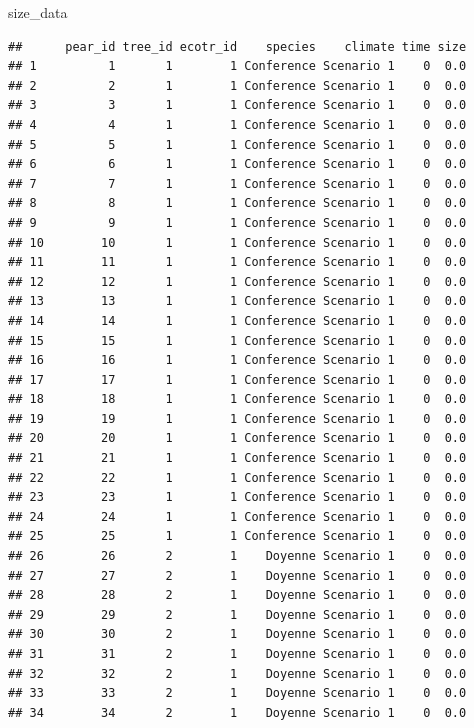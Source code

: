 \documentclass[
]{article}
\newenvironment{Shaded}{\begin{snugshade}}{\end{snugshade}}
\newcommand{\NormalTok}[1]{#1}
\begin{document}
\begin{Shaded}
\begin{Highlighting}[]
\NormalTok{size\_data}
\end{Highlighting}
\end{Shaded}

\begin{verbatim}
##      pear_id tree_id ecotr_id    species    climate time size
## 1          1       1        1 Conference Scenario 1    0  0.0
## 2          2       1        1 Conference Scenario 1    0  0.0
## 3          3       1        1 Conference Scenario 1    0  0.0
## 4          4       1        1 Conference Scenario 1    0  0.0
## 5          5       1        1 Conference Scenario 1    0  0.0
## 6          6       1        1 Conference Scenario 1    0  0.0
## 7          7       1        1 Conference Scenario 1    0  0.0
## 8          8       1        1 Conference Scenario 1    0  0.0
## 9          9       1        1 Conference Scenario 1    0  0.0
## 10        10       1        1 Conference Scenario 1    0  0.0
## 11        11       1        1 Conference Scenario 1    0  0.0
## 12        12       1        1 Conference Scenario 1    0  0.0
## 13        13       1        1 Conference Scenario 1    0  0.0
## 14        14       1        1 Conference Scenario 1    0  0.0
## 15        15       1        1 Conference Scenario 1    0  0.0
## 16        16       1        1 Conference Scenario 1    0  0.0
## 17        17       1        1 Conference Scenario 1    0  0.0
## 18        18       1        1 Conference Scenario 1    0  0.0
## 19        19       1        1 Conference Scenario 1    0  0.0
## 20        20       1        1 Conference Scenario 1    0  0.0
## 21        21       1        1 Conference Scenario 1    0  0.0
## 22        22       1        1 Conference Scenario 1    0  0.0
## 23        23       1        1 Conference Scenario 1    0  0.0
## 24        24       1        1 Conference Scenario 1    0  0.0
## 25        25       1        1 Conference Scenario 1    0  0.0
## 26        26       2        1    Doyenne Scenario 1    0  0.0
## 27        27       2        1    Doyenne Scenario 1    0  0.0
## 28        28       2        1    Doyenne Scenario 1    0  0.0
## 29        29       2        1    Doyenne Scenario 1    0  0.0
## 30        30       2        1    Doyenne Scenario 1    0  0.0
## 31        31       2        1    Doyenne Scenario 1    0  0.0
## 32        32       2        1    Doyenne Scenario 1    0  0.0
## 33        33       2        1    Doyenne Scenario 1    0  0.0
## 34        34       2        1    Doyenne Scenario 1    0  0.0

\end{verbatim}
\end{document}
